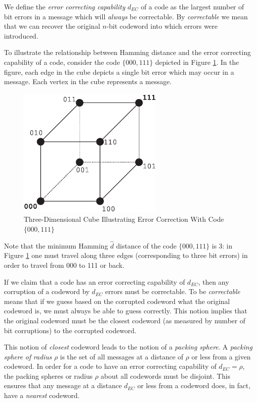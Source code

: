 We define the %
\emph{error correcting capability} $d_{EC}$ of a code  as the largest number of bit errors 
in a message which will \emph{always} be correctable.  By \emph{correctable} we mean
that we can recover the original $n$-bit codeword into which errors were introduced.

To illustrate the relationship between Hamming distance and the error correcting
capability of a code, consider the code $\{000, 111\}$ depicted in
Figure \ref{fig:cedc0:scon0:secv0:01}.  In the figure, each edge in the cube depicts
a single bit error which may occur in a message.  Each vertex in the cube 
represents a message.

\begin{figure}
\centering
\includegraphics[height=2.5in]{c_edc0/cube01.eps}
\caption{Three-Dimensional Cube Illustrating Error Correction With Code $\{000, 111\}$}
\label{fig:cedc0:scon0:secv0:01}
\end{figure}

Note that the minimum Hamming $\hat{d}$ distance of the code $\{000, 111\}$ is 3:  in
Figure \ref{fig:cedc0:scon0:secv0:01} one must travel along three edges
(corresponding to three bit errors) in order to travel from 000 to 111 or back.

If we claim that a code has an error correcting capability of $d_{EC}$, 
then any corruption of a codeword by $d_{EC}$ errors must be correctable.
To be \emph{correctable} means that if we guess based on the corrupted
codeword what the original codeword is, we must always be able to guess
correctly.  This notion implies that the original codeword must be the 
closest codeword (as measured by number of bit corruptions) to the corrupted codeword.

This notion of \emph{closest} codeword leads to the notion of a \emph{packing sphere}.
A \emph{packing sphere of radius $\rho$} is the set of all messages
at a distance of $\rho$ or less from a given codeword.  In order for 
a code to have an error correcting capability of $d_{EC}=\rho$, 
the packing spheres or radius $\rho$ about all codewords must be disjoint.
This ensures that any message at a distance $d_{EC}$ or less from a codeword
does, in fact, have a \emph{nearest} codeword.

